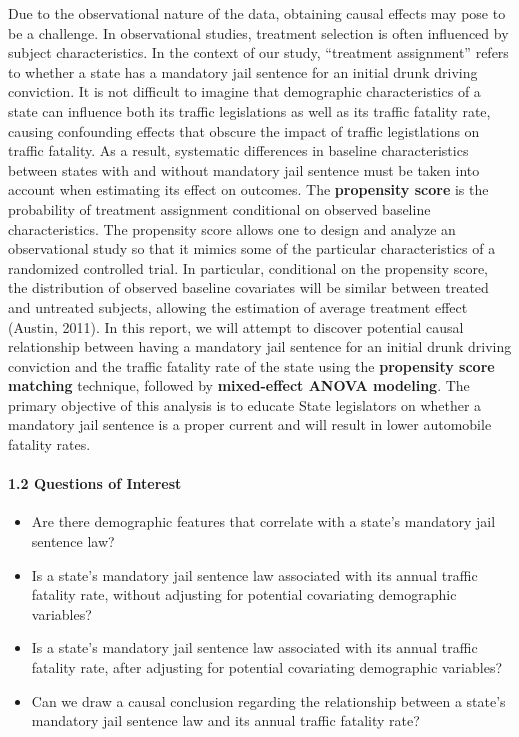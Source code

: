 \documentclass[]{article}
\providecommand{\tightlist}{%
  \setlength{\itemsep}{0pt}\setlength{\parskip}{0pt}}
\let\oldparagraph\paragraph
\renewcommand{\paragraph}[1]{\oldparagraph{#1}\mbox{}}
\begin{document}
Due to the observational nature of the data, obtaining causal effects may pose to be a challenge. In observational studies, treatment selection is often influenced by subject characteristics. In the context of our study, ``treatment assignment'' refers to whether a state has a mandatory jail sentence for an initial drunk driving conviction. It is not difficult to imagine that demographic characteristics of a state can influence both its traffic legislations as well as its traffic fatality rate, causing confounding effects that obscure the impact of traffic legistlations on traffic fatality. As a result, systematic differences in baseline characteristics between states with and without mandatory jail sentence must be taken into account when estimating its effect on outcomes. The \textbf{propensity score} is the probability of treatment assignment conditional on observed baseline characteristics. The propensity score allows one to design and analyze an observational study so that it mimics some of the particular characteristics of a randomized controlled trial. In particular, conditional on the propensity score, the distribution of observed baseline covariates will be similar between treated and untreated subjects, allowing the estimation of average treatment effect (Austin, 2011). In this report, we will attempt to discover potential causal relationship between having a mandatory jail sentence for an initial drunk driving conviction and the traffic fatality rate of the state using the \textbf{propensity score matching} technique, followed by \textbf{mixed-effect ANOVA modeling}. The primary objective of this analysis is to educate State legislators on whether a mandatory jail sentence is a proper current and will result in lower automobile fatality rates.

\hypertarget{questions-of-interest}{%
\paragraph{1.2 Questions of Interest}\label{questions-of-interest}}

\begin{itemize}
\tightlist
\item
  Are there demographic features that correlate with a state's mandatory jail sentence law?\\
\item
  Is a state's mandatory jail sentence law associated with its annual traffic fatality rate, without adjusting for potential covariating demographic variables?\\
\item
  Is a state's mandatory jail sentence law associated with its annual traffic fatality rate, after adjusting for potential covariating demographic variables?\\
\item
  Can we draw a causal conclusion regarding the relationship between a state's mandatory jail sentence law and its annual traffic fatality rate?
\end{itemize}
\end{document}
